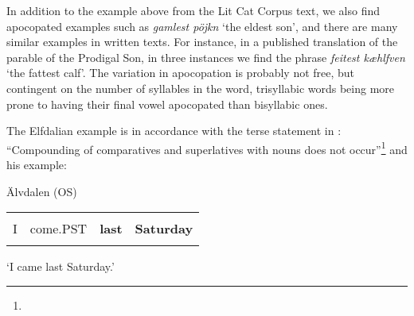 \begin{styleBodytextC}
In addition to the example above from the Lit Cat Corpus text, we also find apocopated examples such as \textit{gamlest pöjkn} ‘the eldest son’, and there are many similar examples in written texts. For instance, in a published translation of the parable of the Prodigal Son, in three instances we find the phrase \textit{feitest kæhlfven} ‘the fattest calf’. The variation in apocopation is probably not free, but contingent on the number of syllables in the word, trisyllabic words being more prone to having their final vowel apocopated than bisyllabic ones. 

\end{styleBodytextC}

\begin{styleBodytextC}
The Elfdalian example is in accordance with the terse statement in \citet[57]{Levander1909}: “Compounding of comparatives and superlatives with nouns does not occur”\footnote{} and his example:

\end{styleBodytextC}


\begin{listWWNumileveli}
\item 

\begin{styleExample}
Älvdalen (OS)

\end{styleExample}

\end{listWWNumileveli}

\begin{tabular}{llll}
\lsptoprule
\multicolumn{4}{l}{I

}\\
I & come.PST & {\bfseries last} & {\bfseries Saturday}\\
\lspbottomrule
\end{tabular}

\begin{styleTranslation}
‘I came last Saturday.’

\end{styleTranslation}

